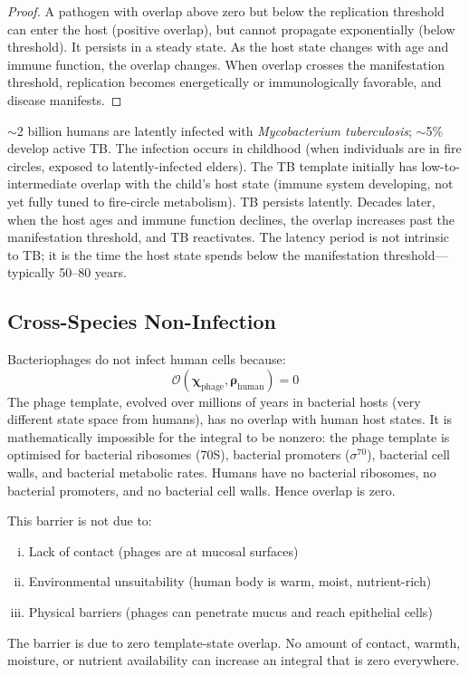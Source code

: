 \documentclass[11pt,twocolumn,a4paper]{article}
\newcommand{\Template}{\boldsymbol{\chi}}
\newcommand{\State}{\boldsymbol{\rho}}
\newcommand{\Overlap}{\mathcal{O}}
\begin{document}
\begin{proof}
A pathogen with overlap above zero but below the replication threshold can enter the host (positive overlap), but cannot propagate exponentially (below threshold). It persists in a steady state. As the host state changes with age and immune function, the overlap changes. When overlap crosses the manifestation threshold, replication becomes energetically or immunologically favorable, and disease manifests.
\end{proof}

\begin{example}
$\sim$2 billion humans are latently infected with \textit{Mycobacterium tuberculosis}; $\sim$5\% develop active TB. The infection occurs in childhood (when individuals are in fire circles, exposed to latently-infected elders). The TB template initially has low-to-intermediate overlap with the child's host state (immune system developing, not yet fully tuned to fire-circle metabolism). TB persists latently. Decades later, when the host ages and immune function declines, the overlap increases past the manifestation threshold, and TB reactivates. The latency period is not intrinsic to TB; it is the time the host state spends below the manifestation threshold—typically 50--80 years.
\end{example}

\subsection{Cross-Species Non-Infection}

\begin{corollary}
\label{cor:cross_species}
Bacteriophages do not infect human cells because:
\begin{equation}
\Overlap(\Template_{\mathrm{phage}}, \State_{\mathrm{human}}) = 0
\label{eq:phage_human_overlap}
\end{equation}
The phage template, evolved over millions of years in bacterial hosts (very different state space from humans), has no overlap with human host states. It is mathematically impossible for the integral to be nonzero: the phage template is optimised for bacterial ribosomes (70S), bacterial promoters ($\sigma^{70}$), bacterial cell walls, and bacterial metabolic rates. Humans have no bacterial ribosomes, no bacterial promoters, and no bacterial cell walls. Hence overlap is zero.

This barrier is not due to:
\begin{enumerate}[(i)]
\item Lack of contact (phages are at mucosal surfaces)
\item Environmental unsuitability (human body is warm, moist, nutrient-rich)
\item Physical barriers (phages can penetrate mucus and reach epithelial cells)
\end{enumerate}
The barrier is due to zero template-state overlap. No amount of contact, warmth, moisture, or nutrient availability can increase an integral that is zero everywhere.
\end{corollary}
\end{document}
